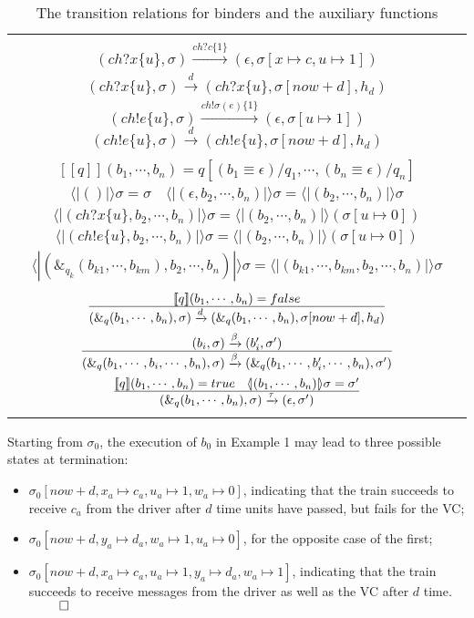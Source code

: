 \documentclass{llncs}
\newcommand{\leadm}[1]{\xrightarrow{#1}}
\newcommand{\pstop}{\epsilon}
\newcommand{\now}{now}
\newcommand{\fracN}[2]{\frac{\small \textstyle #1}{\small \textstyle #2}}
\newcommand{\seman}[1]{[\![#1 ]\!]}
\newcommand{\ptrue}{true}
\newcommand{\pfalse}{false}
\newcommand{\rec}[1]{\langle\!|(#1)|\!\rangle}
\begin{document}
\begin{table}[t]
\small
\centering
\begin{tabular}{c}
\hline \\
$(ch?x\{u\}, \sigma) \leadm{ch?c\{1\}} (\pstop, \sigma[x \mapsto c, u \mapsto 1])$ \\[0.5em]
$(ch?x\{u\}, \sigma) \leadm{d} (ch?x\{u\},\sigma[\now +d], h_d)$\\[0.5em]
$(ch!e\{u\}, \sigma) \leadm{ch!\sigma(e)\{1\}} (\pstop, \sigma[u \mapsto 1])$ $(ch!e\{u\}, \sigma) \leadm{d} (ch!e\{u\},\sigma[\now +d], h_d)$\\[0.5em]
\hline \\
$\seman{q}(b_1, \cdots,  b_n) = q[(b_1 \equiv \pstop)/q_1, \cdots,  (b_n \equiv \pstop)/q_n]$ \\[0.5em]
$\rec{} \sigma = \sigma \quad  \rec{\pstop, b_2, \cdots, b_n} \sigma =  \rec{b_2, \cdots, b_n} \sigma$\\[0.5em]
$\rec{ch?x\{u\}, b_2, \cdots, b_n} \sigma =  \rec{b_2, \cdots, b_n} (\sigma[u \mapsto 0]) $\\[0.5em]
$\rec{ch!e\{u\}, b_2, \cdots, b_n} \sigma =  \rec{b_2, \cdots, b_n} (\sigma[u \mapsto 0])$\\[0.5em]
$\rec{\&_{q_k}(b_{k1}, \cdots, b_{km}), b_2, \cdots, b_n} \sigma =\rec{b_{k1}, \cdots, b_{km}, b_2, \cdots, b_n}  \sigma $\\[0.5em]
\hline\\
$\fracN{\seman{q}(b_1, \cdots,  b_n) = \pfalse}{(\&_q(b_1, \cdots, b_n), \sigma) \leadm{d}
(\&_q(b_1, \cdots, b_n),\sigma[\now +d], h_d)}$\\[1em]
$\fracN{(b_i, \sigma) \leadm{\beta} (b_i', \sigma') }
{(\&_q(b_1, \cdots,  b_i, \cdots, b_n), \sigma) \leadm{\beta} (\&_q(b_1, \cdots, b_i', \cdots, b_n), \sigma')}$\\[1.2em]
$\fracN{
\seman{q}(b_1, \cdots, b_n) = \ptrue \quad \rec{b_1, \cdots,  b_n} \sigma = \sigma'}
{(\&_q(b_1, \cdots, b_n), \sigma) \leadm{\tau} (\pstop, \sigma')}$\\[1.3em]
\hline\\[-0.52em]
\end{tabular}
\caption{The transition relations for binders and the auxiliary functions}
\label{semantic:binder}
\end{table}

\example
Starting from  $\sigma_0$, the execution of $b_0$ in Example 1
may lead to three possible states at termination:
\begin{itemize}
\item
$\sigma_0[\now + d, x_a \mapsto c_a, u_a \mapsto 1, w_a \mapsto 0]$, indicating that the train succeeds to receive
$c_a$ from the driver after $d$ time units have passed, but fails for the VC;
\item $\sigma_0[\now + d, y_a \mapsto d_a, w_a \mapsto 1, u_a \mapsto 0]$, for the opposite case of the first;
\item $\sigma_0[\now + d, x_a \mapsto c_a, u_a \mapsto 1, y_a \mapsto d_a, w_a \mapsto 1]$, indicating that
the train succeeds to receive messages from the driver as well as the VC after $d$ time. $\ \qed$
\end{itemize}
\end{document}
